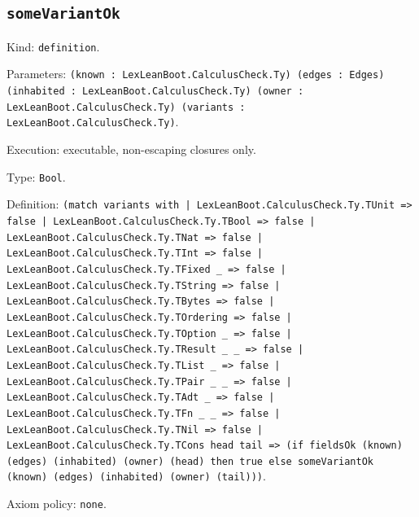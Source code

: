 \documentclass[11pt]{article}
\begin{document}
\subsection*{\texttt{someVariantOk}}
\noindent Kind: \texttt{definition}.\par
\noindent Parameters: \texttt{(known : LexLeanBoot.CalculusCheck.Ty) (edges : Edges) (inhabited : LexLeanBoot.CalculusCheck.Ty) (owner : LexLeanBoot.CalculusCheck.Ty) (variants : LexLeanBoot.CalculusCheck.Ty)}.\par
\noindent Execution: executable, non-escaping closures only.\par
\noindent Type: \texttt{Bool}.\par
\noindent Definition: \texttt{(match variants with | LexLeanBoot.CalculusCheck.Ty.TUnit => false | LexLeanBoot.CalculusCheck.Ty.TBool => false | LexLeanBoot.CalculusCheck.Ty.TNat => false | LexLeanBoot.CalculusCheck.Ty.TInt => false | LexLeanBoot.CalculusCheck.Ty.TFixed \_ => false | LexLeanBoot.CalculusCheck.Ty.TString => false | LexLeanBoot.CalculusCheck.Ty.TBytes => false | LexLeanBoot.CalculusCheck.Ty.TOrdering => false | LexLeanBoot.CalculusCheck.Ty.TOption \_ => false | LexLeanBoot.CalculusCheck.Ty.TResult \_ \_ => false | LexLeanBoot.CalculusCheck.Ty.TList \_ => false | LexLeanBoot.CalculusCheck.Ty.TPair \_ \_ => false | LexLeanBoot.CalculusCheck.Ty.TAdt \_ => false | LexLeanBoot.CalculusCheck.Ty.TFn \_ \_ => false | LexLeanBoot.CalculusCheck.Ty.TNil => false | LexLeanBoot.CalculusCheck.Ty.TCons head tail => (if fieldsOk (known) (edges) (inhabited) (owner) (head) then true else someVariantOk (known) (edges) (inhabited) (owner) (tail)))}.\par
\noindent Axiom policy: \texttt{none}.\par
\end{document}

